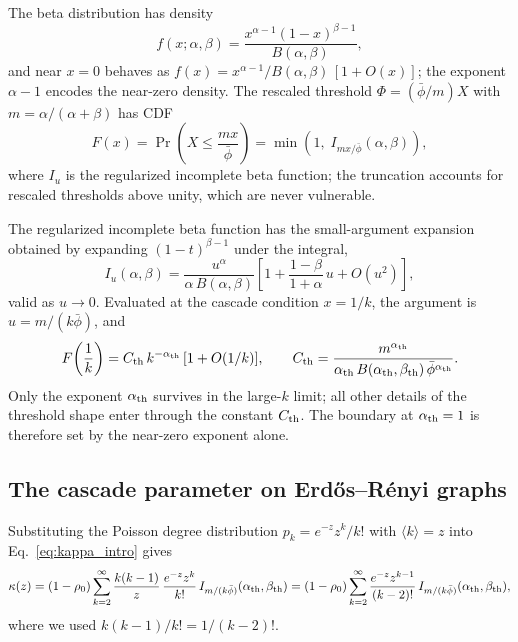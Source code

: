\documentclass[]{revtex4-2}
\begin{document}
The beta distribution has density
\begin{equation}
    f(x;\alpha,\beta) = \frac{x^{\alpha-1}(1-x)^{\beta-1}}{B(\alpha,\beta)},
\end{equation}
and near $x=0$ behaves as $f(x) = x^{\alpha-1}/B(\alpha,\beta)\,[1+O(x)]$; the exponent $\alpha-1$ encodes the near-zero density. The rescaled threshold $\Phi=(\bar\phi/m)X$ with $m=\alpha/(\alpha+\beta)$ has CDF
\begin{equation}
    F(x) = \Pr\left(X \le \frac{m x}{\bar\phi}\right)
    = \min\!\left(1,\; I_{m x/\bar\phi}(\alpha,\beta)\right),
\end{equation}
where $I_u$ is the regularized incomplete beta function; the truncation accounts for rescaled thresholds above unity, which are never vulnerable.

The regularized incomplete beta function has the small-argument expansion obtained by expanding $(1-t)^{\beta-1}$ under the integral,
\begin{equation}
    I_u(\alpha,\beta)
    = \frac{u^\alpha}{\alpha\,B(\alpha,\beta)}
    \left[1 + \frac{1-\beta}{1+\alpha}\,u + O(u^2)\right],
    \label{eq:Iu-asym}
\end{equation}
valid as $u\to0$. Evaluated at the cascade condition $x=1/k$, the argument is $u = m/(k\bar\phi)$, and
\begin{equation}
    F\!\left(\frac{1}{k}\right)
    = C_{\rm th}\, k^{-\alpha_{\rm th}}\,[1+O(1/k)],
    \qquad
    C_{\rm th} = \frac{m^{\alpha_{\rm th}}}{\alpha_{\rm th}\,B(\alpha_{\rm th},\beta_{\rm th})\,\bar\phi^{\alpha_{\rm th}}}.
    \label{eq:Ftail}
\end{equation}
Only the exponent $\alpha_{\rm th}$ survives in the large-$k$ limit; all other details of the threshold shape enter through the constant $C_{\rm th}$. The boundary at $\alpha_{\rm th}=1$ is therefore set by the near-zero exponent alone.

\subsection{The cascade parameter on Erd\H{o}s--R\'{e}nyi graphs}

Substituting the Poisson degree distribution $p_k = e^{-z}z^k/k!$ with $\langle k\rangle=z$ into Eq.~\eqref{eq:kappa_intro} gives
\begin{equation}
    \kappa(z)
    = (1-\rho_0)\sum_{k=2}^{\infty}
    \frac{k(k-1)}{z}\,\frac{e^{-z}z^k}{k!}\,I_{m/(k\bar\phi)}(\alpha_{\rm th},\beta_{\rm th})
    = (1-\rho_0)\sum_{k=2}^{\infty}
    \frac{e^{-z}z^{k-1}}{(k-2)!}\,I_{m/(k\bar\phi)}(\alpha_{\rm th},\beta_{\rm th}),
\end{equation}
where we used $k(k-1)/k! = 1/(k-2)!$.
\end{document}
